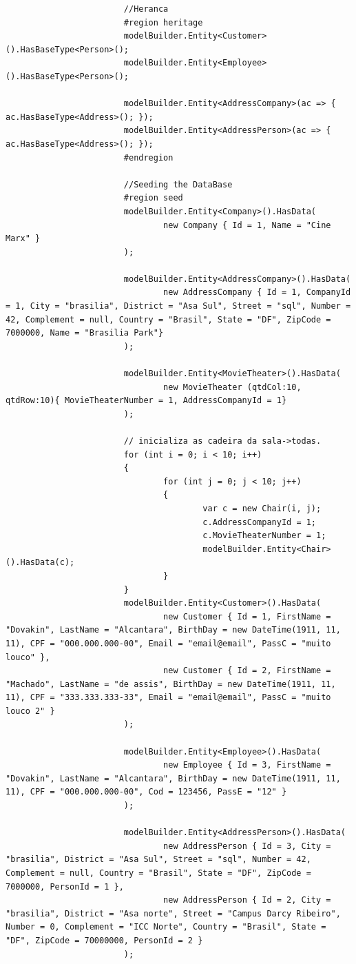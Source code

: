 \documentclass[a4paper,10pt]{article}
\begin{document}
\begin{lstlisting}
						//Heranca
						#region heritage
						modelBuilder.Entity<Customer>().HasBaseType<Person>();
						modelBuilder.Entity<Employee>().HasBaseType<Person>();

						modelBuilder.Entity<AddressCompany>(ac => { ac.HasBaseType<Address>(); });
						modelBuilder.Entity<AddressPerson>(ac => { ac.HasBaseType<Address>(); });
						#endregion

						//Seeding the DataBase
						#region seed
						modelBuilder.Entity<Company>().HasData(
								new Company { Id = 1, Name = "Cine Marx" }
						);

						modelBuilder.Entity<AddressCompany>().HasData(
								new AddressCompany { Id = 1, CompanyId = 1, City = "brasilia", District = "Asa Sul", Street = "sql", Number = 42, Complement = null, Country = "Brasil", State = "DF", ZipCode = 7000000, Name = "Brasilia Park"}
						);

						modelBuilder.Entity<MovieTheater>().HasData(
								new MovieTheater (qtdCol:10, qtdRow:10){ MovieTheaterNumber = 1, AddressCompanyId = 1}
						);

						// inicializa as cadeira da sala->todas.
						for (int i = 0; i < 10; i++)
						{
								for (int j = 0; j < 10; j++)
								{
										var c = new Chair(i, j);
										c.AddressCompanyId = 1;
										c.MovieTheaterNumber = 1;
										modelBuilder.Entity<Chair>().HasData(c);
								}
						}
						modelBuilder.Entity<Customer>().HasData(
								new Customer { Id = 1, FirstName = "Dovakin", LastName = "Alcantara", BirthDay = new DateTime(1911, 11, 11), CPF = "000.000.000-00", Email = "email@email", PassC = "muito louco" },
								new Customer { Id = 2, FirstName = "Machado", LastName = "de assis", BirthDay = new DateTime(1911, 11, 11), CPF = "333.333.333-33", Email = "email@email", PassC = "muito louco 2" }
						);

						modelBuilder.Entity<Employee>().HasData(
								new Employee { Id = 3, FirstName = "Dovakin", LastName = "Alcantara", BirthDay = new DateTime(1911, 11, 11), CPF = "000.000.000-00", Cod = 123456, PassE = "12" }
						);

						modelBuilder.Entity<AddressPerson>().HasData(
								new AddressPerson { Id = 3, City = "brasilia", District = "Asa Sul", Street = "sql", Number = 42, Complement = null, Country = "Brasil", State = "DF", ZipCode = 7000000, PersonId = 1 },
								new AddressPerson { Id = 2, City = "brasilia", District = "Asa norte", Street = "Campus Darcy Ribeiro", Number = 0, Complement = "ICC Norte", Country = "Brasil", State = "DF", ZipCode = 70000000, PersonId = 2 }
						);


\end{lstlisting}
\end{document}
